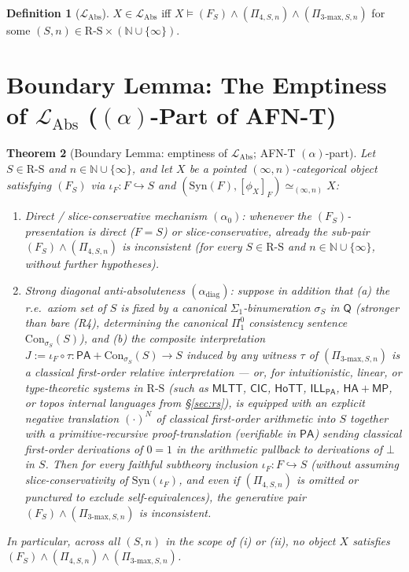 \documentclass[11pt]{article}
\theoremstyle{plain}
\newtheorem{theorem}{Theorem}[section]
\theoremstyle{definition}
\newtheorem{definition}[theorem]{Definition}
\newcommand{\RS}{\mathrm{R\text{-}S}}
\newcommand{\LAbs}{\mathcal{L}_{\mathrm{Abs}}}
\newcommand{\Syn}{\mathrm{Syn}}
\newcommand{\Con}{\mathrm{Con}}
\newcommand{\PA}{\mathsf{PA}}
\newcommand{\MLTT}{\mathsf{MLTT}}
\newcommand{\HoTT}{\mathsf{HoTT}}
\newcommand{\CIC}{\mathsf{CIC}}
\begin{document}
\begin{definition}[$\LAbs$]\label{def:level6}
$X \in \LAbs$ iff $X \models (F_S) \wedge (\Pi_{4, S, n}) \wedge (\Pi_{3\text{-max}, S, n})$ for some $(S, n) \in \RS \times (\mathbb{N} \cup \{\infty\})$.
\end{definition}

\section{\texorpdfstring{Boundary Lemma: The Emptiness of $\LAbs$ ($(\alpha)$-Part of AFN-T)}{Boundary Lemma: The Emptiness of L\_Abs ((alpha)-Part of AFN-T)}}\label{sec:afnt-alpha}

\begin{theorem}[Boundary Lemma: emptiness of $\LAbs$; AFN-T $(\alpha)$-part]\label{thm:afnt-alpha}
Let $S \in \RS$ and $n \in \mathbb{N} \cup \{\infty\}$, and let $X$ be a pointed $(\infty, n)$-categorical object satisfying $(F_S)$ via $\iota_F : F \hookrightarrow S$ and $(\Syn(F), [\phi_X]_F) \simeq_{(\infty, n)} X$:
\begin{enumerate}[nosep,label=(\roman*)]
\item \emph{Direct / slice-conservative mechanism $(\alpha_0)$}: whenever the $(F_S)$-presentation is direct ($F = S$) or slice-conservative, already the sub-pair $(F_S) \wedge (\Pi_{4, S, n})$ is inconsistent (for every $S \in \RS$ and $n \in \mathbb{N} \cup \{\infty\}$, without further hypotheses).
\item \emph{Strong diagonal anti-absoluteness $(\alpha_{\mathrm{diag}})$}: suppose in addition that (a) the r.e.\ axiom set of $S$ is fixed by a canonical $\Sigma_1$-binumeration $\sigma_S$ in $\mathsf{Q}$ (stronger than bare (R4), determining the canonical $\Pi_1^0$ consistency sentence $\Con_{\sigma_S}(S)$), and (b) the composite interpretation $J := \iota_F \circ \tau : \PA + \Con_{\sigma_S}(S) \to S$ induced by any witness $\tau$ of $(\Pi_{3\text{-max}, S, n})$ is a classical first-order relative interpretation --- or, for intuitionistic, linear, or type-theoretic systems in $\RS$ (such as $\MLTT$, $\CIC$, $\HoTT$, $\mathsf{ILL}_{\mathsf{PA}}$, $\mathsf{HA}+\mathsf{MP}$, or topos internal languages from \S\ref{sec:rs}), is equipped with an explicit negative translation $(\cdot)^N$ of classical first-order arithmetic into $S$ together with a primitive-recursive proof-translation (verifiable in $\PA$) sending classical first-order derivations of $0 = 1$ in the arithmetic pullback to derivations of $\bot$ in $S$. Then for \emph{every} faithful subtheory inclusion $\iota_F : F \hookrightarrow S$ (without assuming slice-conservativity of $\Syn(\iota_F)$, and even if $(\Pi_{4, S, n})$ is omitted or punctured to exclude self-equivalences), the generative pair $(F_S) \wedge (\Pi_{3\text{-max}, S, n})$ is inconsistent.
\end{enumerate}
In particular, across all $(S, n)$ in the scope of (i) or (ii), no object $X$ satisfies $(F_S) \wedge (\Pi_{4, S, n}) \wedge (\Pi_{3\text{-max}, S, n})$.
\end{theorem}
\end{document}
